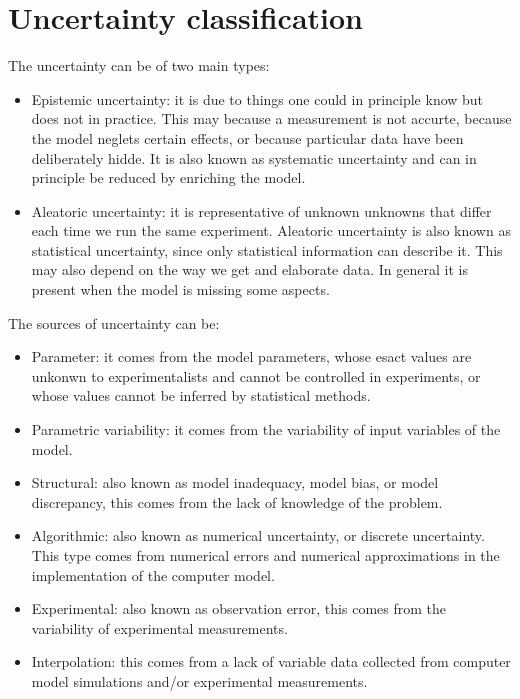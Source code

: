 \documentclass[12pt, a4paper]{report}
\theoremstyle{remark}
\theoremstyle{definition}
\begin{document}
    \section{Uncertainty classification}
    The uncertainty can be of two main types: 
    \begin{itemize}
        \item Epistemic uncertainty: it is due to things one could in principle know but does not in practice. This may because a 
            measurement is not accurte, because the model neglets certain effects, or because particular data have been deliberately
            hidde. It is also known as systematic uncertainty and can in principle be reduced by enriching the model.      
        \item Aleatoric uncertainty: it is representative of unknown unknowns that differ each time we run the same experiment. 
            Aleatoric uncertainty is also known as statistical uncertainty, since only statistical information can describe it. This may
            also depend on the way we get and elaborate data. In general it is present when the model is missing some aspects.
    \end{itemize}
    The sources of uncertainty can be: 
    \begin{itemize}
        \item Parameter: it comes from the model parameters, whose esact values are unkonwn to experimentalists and cannot be controlled
            in experiments, or whose values cannot be inferred by statistical methods. 
        \item Parametric variability: it comes from the variability of input variables of the model. 
        \item Structural: also known as model inadequacy, model bias, or model discrepancy, this comes from the lack of knowledge of the
            problem.
        \item Algorithmic: also known as numerical uncertainty, or discrete uncertainty. This type comes from numerical errors and
            numerical approximations in the implementation of the computer model. 
        \item Experimental: also known as observation error, this comes from the variability of experimental measurements.
        \item Interpolation: this comes from a lack of variable data collected from computer model simulations and/or experimental 
            measurements. 
    \end{itemize}
\end{document}
